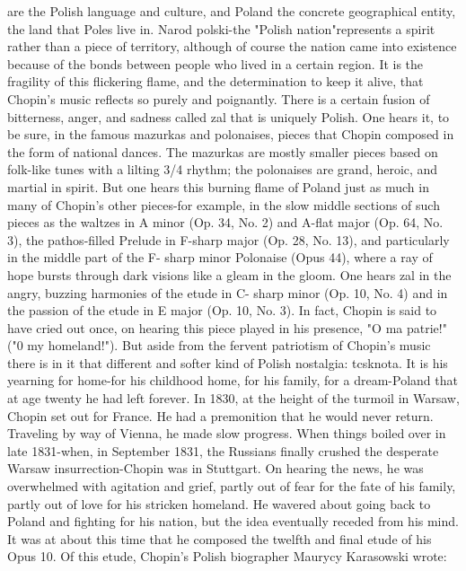 are the Polish language and culture, and Poland the concrete geographical entity, the land
that Poles live in. Narod polski-the "Polish nation"represents a spirit rather than a piece
of territory, although of course the nation came into existence because of the bonds
between people who lived in a certain region. It is the fragility of this flickering flame,
and the determination to keep it alive, that Chopin's music reflects so purely and
poignantly. There is a certain fusion of bitterness, anger, and sadness called zal that is
uniquely Polish. One hears it, to be sure, in the famous mazurkas and polonaises, pieces
that Chopin composed in the form of national dances. The mazurkas are mostly smaller
pieces based on folk-like tunes with a lilting 3/4 rhythm; the polonaises are grand, heroic,
and martial in spirit. But one hears this burning flame of Poland just as much in many of
Chopin's other pieces-for example, in the slow middle sections of such pieces as the
waltzes in A minor (Op. 34, No. 2) and A-flat major (Op. 64, No. 3), the pathos-filled
Prelude in F-sharp major (Op. 28, No. 13), and particularly in the middle part of the F-
sharp minor Polonaise (Opus 44), where a ray of hope bursts through dark visions like a
gleam in the gloom. One hears zal in the angry, buzzing harmonies of the etude in C-
sharp minor (Op. 10, No. 4) and in the passion of the etude in E major (Op. 10, No. 3). In
fact, Chopin is said to have cried out once, on hearing this piece played in his presence,
"O ma patrie!" ("0 my homeland!").
        But aside from the fervent patriotism of Chopin's music there is in it that different
and softer kind of Polish nostalgia: tcsknota. It is his yearning for home-for his childhood
home, for his family, for a dream-Poland that at age twenty he had left forever. In 1830,
at the height of the turmoil in Warsaw, Chopin set out for France. He had a premonition
that he would never return. Traveling by way of Vienna, he made slow progress. When
things boiled over in late 1831-when, in September 1831, the Russians finally crushed the
desperate Warsaw insurrection-Chopin was in Stuttgart. On hearing the news, he was
overwhelmed with agitation and grief, partly out of fear for the fate of his family, partly
out of love for his stricken homeland. He wavered about going back to Poland and
fighting for his nation, but the idea eventually receded from his mind.
It was at about this time that he composed the twelfth and final etude of his Opus 10. Of
this etude, Chopin's Polish biographer Maurycy Karasowski wrote:

